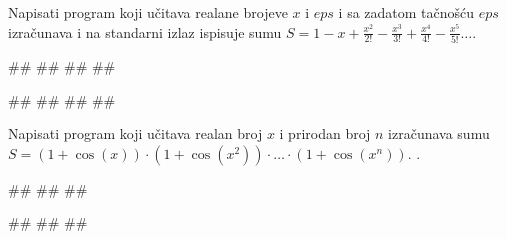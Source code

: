 \begin{Exercise}[difficulty=1, label=p1.3_13]
Napisati program koji učitava realane brojeve $x$ i $eps$ i sa zadatom
tačnošću $eps$ izračunava i na standarni izlaz ispisuje sumu
$S=1-x+\frac{x^2}{2!}-\frac{x^3}{3!}+\frac{x^4}{4!}-\frac{x^5}{5!}\ldots$. 
  
\begin{miditest}
\begin{upotreba}{1}
#\naslovInt#
##
##
##
\end{upotreba}
\end{miditest}
\begin{miditest}
\begin{upotreba}{2}
#\naslovInt#
##
##
##
\end{upotreba}
\end{miditest}
\end{Exercise}
\begin{Answer}[ref=p1.3_13]
\end{Answer}

\begin{Exercise}[label=p1.razno4] 
Napisati program koji učitava realan broj $x$ i prirodan broj $n$
izračunava sumu $S = (1 + \cos(x))\cdot(1 + \cos(x^2))\cdot \ldots
\cdot(1 + \cos(x^n))$. .  

\begin{miditest}
\begin{upotreba}{1}
#\naslovInt#
##
##
\end{upotreba}
\end{miditest}
\begin{miditest}
\begin{upotreba}{2}
#\naslovInt#
##
##
\end{upotreba}
\end{miditest}

\end{Exercise}
\begin{Answer}[ref=p1.razno4]
\end{Answer}


